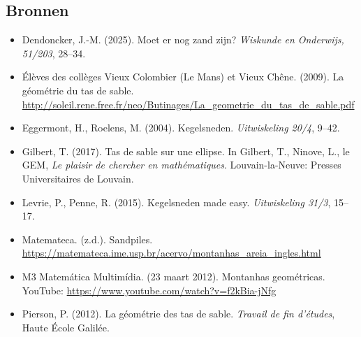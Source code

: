 \documentclass{ximera}
\begin{document}
\subsection*{Bronnen}

\begin{itemize}
    \item Dendoncker, J.-M. (2025). Moet er nog zand zijn? \emph{Wiskunde en Onderwijs, 51/203}, 28--34.
    \item Élèves des collèges Vieux Colombier (Le Mans) et Vieux Chêne. (2009). La géométrie du tas de sable. \url{http://soleil.rene.free.fr/neo/Butinages/La_geometrie_du_tas_de_sable.pdf}
    \item Eggermont, H., Roelens, M. (2004). Kegelsneden. \emph{Uitwiskeling 20/4}, 9--42.
    \item Gilbert, T. (2017). Tas de sable sur une ellipse. In Gilbert, T., Ninove, L., le GEM, \emph{Le plaisir de chercher en mathématiques}. Louvain-la-Neuve: Presses Universitaires de Louvain.
    \item Levrie, P., Penne, R. (2015). Kegelsneden made easy. \emph{Uitwiskeling 31/3}, 15--17.
    \item Matemateca. (z.d.). Sandpiles. \url{https://matemateca.ime.usp.br/acervo/montanhas_areia_ingles.html}
    \item M3 Matemática Multimídia. (23 maart 2012). Montanhas geométricas. YouTube: \url{https://www.youtube.com/watch?v=f2kBia-jNfg}
    \item Pierson, P. (2012). La géométrie des tas de sable. \emph{Travail de fin d'études}, Haute École Galilée.
\end{itemize}
\end{document}
